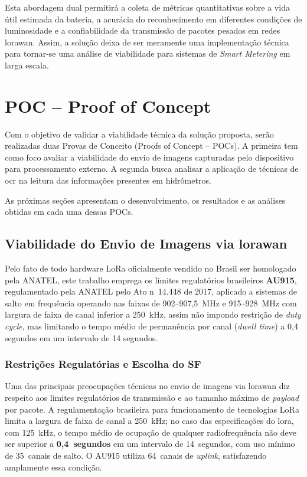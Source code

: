 Esta abordagem dual permitirá a coleta de métricas quantitativas sobre a vida útil estimada da bateria, a acurácia do reconhecimento em diferentes condições de luminosidade e a confiabilidade da transmissão de pacotes pesados em redes \gls{lorawan}. Assim, a solução deixa de ser meramente uma implementação técnica para tornar-se uma análise de viabilidade para sistemas de \textit{Smart Metering} em larga escala.

\section{POC -- Proof of Concept}

Com o objetivo de validar a viabilidade técnica da solução proposta, serão realizadas duas Provas de Conceito (Proofs of Concept -- POCs). A primeira tem como foco avaliar a viabilidade do envio de imagens capturadas pelo dispositivo para processamento externo. A segunda busca analisar a aplicação de técnicas de \gls{ocr} na leitura das informações presentes em hidrômetros.

As próximas seções apresentam o desenvolvimento, os resultados e as análises obtidas em cada uma dessas POCs.

\subsection{Viabilidade do Envio de Imagens via \gls{lorawan}}

Pelo fato de todo hardware LoRa oficialmente vendido no Brasil ser homologado pela ANATEL, 
este trabalho emprega os limites regulatórios brasileiros \textbf{AU915}, 
regulamentado pela ANATEL pelo Ato n\textordmasculine~14.448 de 2017, aplicado a sistemas de salto 
em frequência operando nas faixas de 902--907,5~MHz e 915--928~MHz com largura de faixa de canal inferior a 250~kHz,
assim não impondo restrição de \textit{duty cycle}, mas limitando o tempo médio de permanência por 
canal (\textit{dwell time}) a 0,4 segundos em um intervalo de 14 segundos.


\subsubsection{Restrições Regulatórias e Escolha do SF}
 
Uma das principais preocupações técnicas no envio de imagens via \gls{lorawan} diz
respeito aos limites regulatórios de transmissão e ao tamanho máximo de \textit{\gls{payload}}
por pacote. A regulamentação brasileira para funcionamento de tecnologias LoRa limita a largura de faixa de canal 
a 250~kHz; no caso das especificações do \gls{lora}, com 125~kHz, o tempo médio
de ocupação de qualquer radiofrequência não deve ser superior a \textbf{0,4~segundos}
em um intervalo de 14~segundos, com uso mínimo de 35~canais de salto. O AU915
utiliza 64~canais de \textit{uplink}, satisfazendo amplamente essa condição.
  
